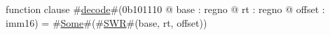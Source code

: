 function clause #\hyperref[zdecode]{decode}#(0b101110 @ base : regno @ rt : regno @ offset : imm16) =
      #\hyperref[zSome]{Some}#(#\hyperref[zSWR]{SWR}#(base, rt, offset))
